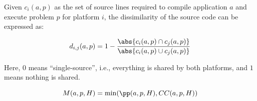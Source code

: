 \begin{definition}
Given $c_i(a, p)$ as the set of source lines required to compile application $a$ and execute problem $p$ for platform $i$, the dissimilarity of the source code can be expressed as:

$$d_{i, j}(a, p) = 1 - \frac{\abs{c_i(a, p) \cap c_j(a, p)}}{\abs{c_i(a, p) \cup c_j(a, p)}}$$
\end{definition}
Here, $0$ means \enquote{single-source}, i.e., everything is shared by both platforms, and $1$ means nothing is shared. 

\begin{definition}
    $$M(a, p, H) = \min(\pp(a, p, H), CC(a, p, H))$$
\end{definition}


















\newpage







